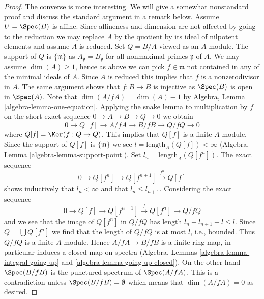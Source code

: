 \begin{proof}
\medskip\noindent
The converse is more interesting. We will give a somewhat nonstandard proof
and discuss the standard argument in a remark below.
Assume $U = \Spec(B)$ is affine. Since affineness and dimension are not
affected by going to the reduction we may replace $A$ by the quotient by
its ideal of nilpotent elements and assume $A$ is reduced.
Set $Q = B/A$ viewed as an $A$-module.
The support of $Q$ is $\{\mathfrak m\}$ as $A_\mathfrak p = B_\mathfrak p$
for all nonmaximal primes $\mathfrak p$ of $A$.
We may assume $\dim(A) \geq 1$, hence as above we can pick
$f \in \mathfrak m$ not contained in any of the minimal ideals of $A$.
Since $A$ is reduced this implies that $f$ is a nonzerodivisor in $A$.
The same argument shows that $f : B \to B$ is injective as $\Spec(B)$
is open in $\Spec(A)$. Note that $\dim(A/fA) = \dim(A) - 1$ by
Algebra, Lemma \ref{algebra-lemma-one-equation}.
Applying the snake lemma to multiplication by $f$ on the short
exact sequence $0 \to A \to B \to Q \to 0$ we obtain
$$
0 \to Q[f] \to A/fA \to B/fB \to Q/fQ \to 0
$$
where $Q[f] = \Ker(f : Q \to Q)$.
This implies that $Q[f]$ is a finite $A$-module. Since the support of
$Q[f]$ is $\{\mathfrak m\}$ we see $l = \text{length}_A(Q[f]) < \infty$
(Algebra, Lemma \ref{algebra-lemma-support-point}).
Set $l_n = \text{length}_A(Q[f^n])$. The exact sequence
$$
0 \to Q[f^n] \to Q[f^{n + 1}] \xrightarrow{f^n} Q[f]
$$
shows inductively that $l_n < \infty$ and that $l_n \leq l_{n + 1}$.
Considering the exact sequence
$$
0 \to Q[f] \to Q[f^{n + 1}] \xrightarrow{f} Q[f^n] \to Q/fQ
$$
and we see that the image of $Q[f^n]$ in $Q/fQ$ has length
$l_n - l_{n + 1} + l \leq l$. Since $Q = \bigcup Q[f^n]$ we
find that the length of $Q/fQ$ is at most $l$, i.e., bounded.
Thus $Q/fQ$ is a finite $A$-module. Hence $A/fA \to B/fB$ is a
finite ring map, in particular induces a closed map on spectra
(Algebra, Lemmas \ref{algebra-lemma-integral-going-up} and
\ref{algebra-lemma-going-up-closed}).
On the other hand $\Spec(B/fB)$ is the punctured spectrum of $\Spec(A/fA)$.
This is a contradiction unless $\Spec(B/fB) = \emptyset$ which
means that $\dim(A/fA) = 0$ as desired.
\end{proof}

